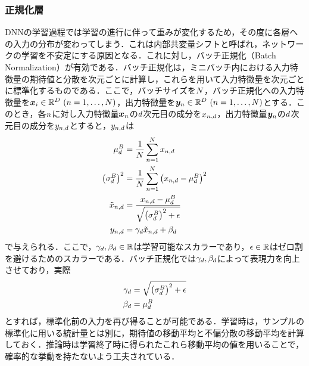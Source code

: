 \documentclass[12pt]{jarticle}
\numberwithin{equation}{section}    %
\numberwithin{figure}{section}      %
\numberwithin{table}{section}      %
\begin{document}
\subsubsection{正規化層}
DNNの学習過程では学習の進行に伴って重みが変化するため，その度に各層への入力の分布が変わってしまう．これは内部共変量シフトと呼ばれ，ネットワークの学習を不安定にする原因となる．これに対し，バッチ正規化（Batch Normalization）\cite{ioffe2015batch}が有効である．バッチ正規化は，ミニバッチ内における入力特徴量の期待値と分散を次元ごとに計算し，これらを用いて入力特徴量を次元ごとに標準化するものである．ここで，バッチサイズを$N$，バッチ正規化への入力特徴量を$\bm{x}_{i} \in \mathbb{R}^{D} ~ (n = 1, \ldots, N)$，出力特徴量を$\bm{y}_{n} \in \mathbb{R}^{D} ~ (n = 1, \ldots, N)$とする．このとき，各$n$に対し入力特徴量$\bm{x}_{n}$の$d$次元目の成分を$x_{n, d}$，出力特徴量$\bm{y}_{n}$の$d$次元目の成分を$y_{n, d}$とすると，$y_{n, d}$は
\begin{align}
    \mu^{B}_{d}                        & = \frac{1}{N} \sum_{n = 1}^{N} x_{n, d}                                        \\
    \left(\sigma^{B}_{d}\right)^{2}    & = \frac{1}{N} \sum_{n = 1}^{N} \left(x_{n, d} - \mu^{B}_{d}\right)^{2} \\
    \tilde{x}_{n, d} & = \frac{x_{n, d} - \mu^{B}_{d}}{\sqrt{\left(\sigma^{B}_{d}\right)^{2} + \epsilon}}     \\
    y_{n, d}        & = \gamma_{d} \tilde{x}_{n, d} +  \beta_{d}
\end{align}
で与えられる．ここで，$\gamma_{d}, \beta_{d} \in \mathbb{R}$は学習可能なスカラーであり，$\epsilon \in \mathbb{R}$はゼロ割を避けるためのスカラーである．バッチ正規化では$\gamma_{d}, \beta_{d}$によって表現力を向上させており，実際
\begin{align}
    \gamma_{d} & = \sqrt{\left(\sigma^{B}_{d}\right)^{2} + \epsilon} \\
    \beta_{d}      & = \mu^{B}_{d}
\end{align}
とすれば，標準化前の入力を再び得ることが可能である．学習時は，サンプルの標準化に用いる統計量とは別に，期待値の移動平均と不偏分散の移動平均を計算しておく．推論時は学習終了時に得られたこれら移動平均の値を用いることで，確率的な挙動を持たないよう工夫されている．
\end{document}
